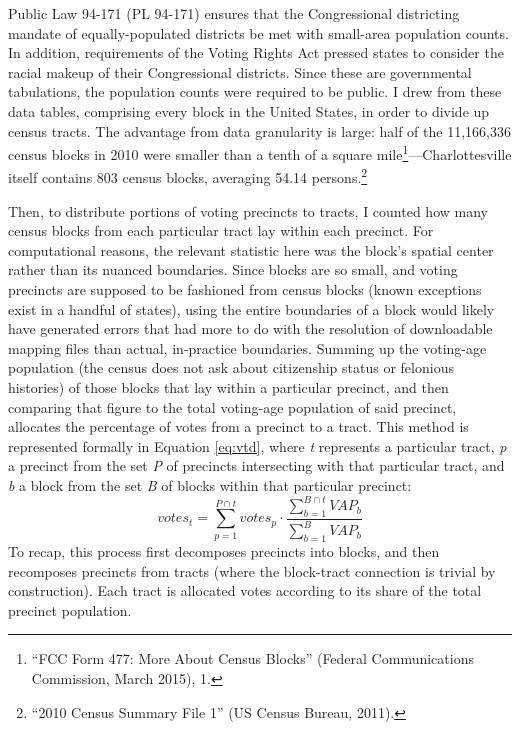 \documentclass[12pt,oneside]{psthesis}
\begin{document}
Public Law 94-171 (PL 94-171) ensures that the Congressional districting mandate of equally-populated districts be met with small-area population counts.
In addition, requirements of the Voting Rights Act pressed states to consider the racial makeup of their Congressional districts.
Since these are governmental tabulations, the population counts were required to be public.
I drew from these data tables, comprising every block in the United States, in order to divide up census tracts.
The advantage from data granularity is large: half of the 11,166,336 census blocks in 2010 were smaller than a tenth of a square mile\footnote{``FCC Form 477: More About Census Blocks'' (Federal Communications Commission, March 2015), 1.}---Charlottesville itself contains 803 census blocks, averaging 54.14 persons.\footnote{``2010 Census Summary File 1'' (US Census Bureau, 2011).}

Then, to distribute portions of voting precincts to tracts, I counted how many census blocks from each particular tract lay within each precinct.
For computational reasons, the relevant statistic here was the block's spatial center rather than its nuanced boundaries.
Since blocks are so small, and voting precincts are supposed to be fashioned from census blocks (known exceptions exist in a handful of states), using the entire boundaries of a block would likely have generated errors that had more to do with the resolution of downloadable mapping files than actual, in-practice boundaries.
Summing up the voting-age population (the census does not ask about citizenship status or felonious histories) of those blocks that lay within a particular precinct, and then comparing that figure to the total voting-age population of said precinct, allocates the percentage of votes from a precinct to a tract.
This method is represented formally in Equation \eqref{eq:vtd}, where \emph{t} represents a particular tract, \emph{p} a precinct from the set \emph{P} of precincts intersecting with that particular tract, and \emph{b} a block from the set \emph{B} of blocks within that particular precinct:
\begin{equation}
votes_{t} = \sum_{p=1}^{P \cap t} votes_p \cdot \frac{\sum_{b=1}^{B \cap t} VAP_b}{\sum_{b=1}^{B} VAP_b}
\label{eq:vtd}
\end{equation}
To recap, this process first decomposes precincts into blocks, and then recomposes precincts from tracts (where the block-tract connection is trivial by construction).
Each tract is allocated votes according to its share of the total precinct population.
\end{document}
